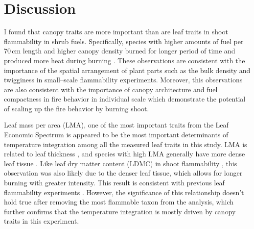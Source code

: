 \documentclass{ttuthes2007}
\begin{document}
\section{Discussion}

I found that canopy traits are more important than are leaf traits in shoot flammability in shrub fuels. %
Specifically, species with higher amounts of fuel per 70\,cm length and higher canopy density burned for longer period of time and produced more heat during burning . These observations are consistent with the importance of the spatial arrangement of plant parts such as the bulk density \citep{pausas2012fires} and twigginess \citep{potts2022growth} in small--scale flammability experiments. Moreover, this observations are also consistent with the importance of canopy architecture and fuel compactness  in fire behavior in individual scale \citep{schwilk2003flammability, madrigal2012evaluation} which demonstrate the potential of scaling up the fire behavior by burning shoot.





Leaf mass per area (LMA), one of the most important traits from the Leaf Economic Spectrum \citep{wright2004worldwide} is appeared to be the most important determinants of temperature integration among all the measured leaf traits in this study. LMA is related to leaf thickness \citep{niinemets1999research}, and species with high LMA generally have more dense leaf tissue \citep{poorter2009causes}. Like leaf dry matter content (LDMC) in shoot flammability \citep{alam2020shoot, potts2022growth}, this observation
was also likely due to the denser leaf tissue, which allows for longer burning with greater intensity. This result is consistent with previous leaf flammability experiments \citep{krix2018landscape}.
However, the significance of this relationship doesn’t hold true after removing the most flammable taxon from the analysis, which further confirms that the temperature integration is mostly driven by canopy traits in this experiment.\\
\end{document}
